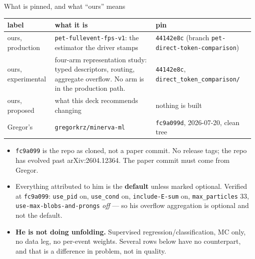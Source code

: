 \documentclass[aspectratio=169,10pt]{beamer}
\newcommand{\ours}[1]{\textcolor{ours}{#1}}
\newcommand{\theirs}[1]{\textcolor{theirs}{#1}}
\newcommand{\warn}[1]{\textcolor{warn}{#1}}
\begin{document}
\begin{frame}{What is pinned, and what ``ours'' means}
  \begin{center}\footnotesize
  \begin{tabular}{@{}R{0.20\textwidth}R{0.40\textwidth}R{0.34\textwidth}@{}}
    \toprule
    \textbf{label} & \textbf{what it is} & \textbf{pin} \\
    \midrule
    \ours{ours, production} &
      \texttt{pet-fullevent-fps-v1}: the estimator the driver stamps &
      \texttt{44142e8c} (branch \texttt{pet-direct-token-comparison}) \\
    \ours{ours, experimental} &
      four-arm representation study: typed descriptors, routing, aggregate overflow.
      \warn{No arm is in the production path.} &
      \texttt{44142e8c}, \texttt{direct\_token\_comparison/} \\
    \ours{ours, proposed} &
      what this deck recommends changing &
      \warn{nothing is built} \\
    \theirs{Gregor's} &
      \texttt{gregorkrz/minerva-ml} &
      \texttt{fc9a099d}, 2026-07-20, clean tree \\
    \bottomrule
  \end{tabular}
  \end{center}
  \vspace{0.5em}
  \begin{itemize}\small
    \item \warn{\texttt{fc9a099} is the repo as cloned, not a paper commit.} No release
      tags; the repo has evolved past arXiv:2604.12364. The paper commit must come
      from Gregor.
    \item Everything attributed to him is the \textbf{default} unless marked optional.
      Verified at \texttt{fc9a099}: \texttt{use\_pid} on, \texttt{use\_cond} on,
      \texttt{include-E-sum} on, \texttt{max\_particles} 33,
      \warn{\texttt{use-max-blobs-and-prongs} \emph{off}} --- so his overflow
      aggregation is optional and not the default.
    \item \textbf{He is not doing unfolding.} Supervised regression/classification, MC
      only, no data leg, no per-event weights. Several rows below have no counterpart,
      and that is a difference in problem, not in quality.
  \end{itemize}
\end{frame}
\end{document}

